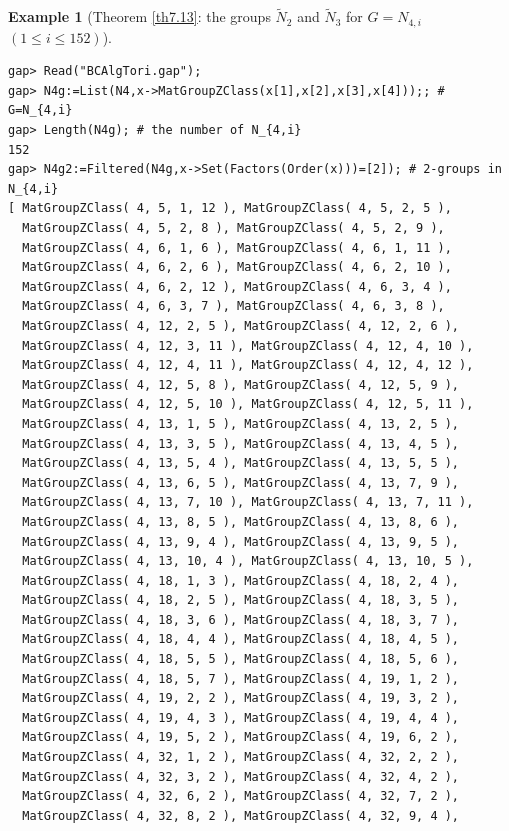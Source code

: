 \documentclass{amsart}
\theoremstyle{plain}
\theoremstyle{definition}
\newtheorem{example}[theorem]{Example}
\theoremstyle{remark}
\begin{document}
\bigskip
\begin{example}[Theorem \ref{th7.13}: the groups $\widetilde{N}_2$ and $\widetilde{N}_3$ for $G=N_{4,i}$ $(1\leq i\leq 152)$]\label{ex7.15}~\vspace*{-5mm}\\
\begin{verbatim}
gap> Read("BCAlgTori.gap");
gap> N4g:=List(N4,x->MatGroupZClass(x[1],x[2],x[3],x[4]));; # G=N_{4,i}
gap> Length(N4g); # the number of N_{4,i}
152
gap> N4g2:=Filtered(N4g,x->Set(Factors(Order(x)))=[2]); # 2-groups in N_{4,i}
[ MatGroupZClass( 4, 5, 1, 12 ), MatGroupZClass( 4, 5, 2, 5 ), 
  MatGroupZClass( 4, 5, 2, 8 ), MatGroupZClass( 4, 5, 2, 9 ), 
  MatGroupZClass( 4, 6, 1, 6 ), MatGroupZClass( 4, 6, 1, 11 ), 
  MatGroupZClass( 4, 6, 2, 6 ), MatGroupZClass( 4, 6, 2, 10 ), 
  MatGroupZClass( 4, 6, 2, 12 ), MatGroupZClass( 4, 6, 3, 4 ), 
  MatGroupZClass( 4, 6, 3, 7 ), MatGroupZClass( 4, 6, 3, 8 ), 
  MatGroupZClass( 4, 12, 2, 5 ), MatGroupZClass( 4, 12, 2, 6 ), 
  MatGroupZClass( 4, 12, 3, 11 ), MatGroupZClass( 4, 12, 4, 10 ), 
  MatGroupZClass( 4, 12, 4, 11 ), MatGroupZClass( 4, 12, 4, 12 ), 
  MatGroupZClass( 4, 12, 5, 8 ), MatGroupZClass( 4, 12, 5, 9 ), 
  MatGroupZClass( 4, 12, 5, 10 ), MatGroupZClass( 4, 12, 5, 11 ), 
  MatGroupZClass( 4, 13, 1, 5 ), MatGroupZClass( 4, 13, 2, 5 ), 
  MatGroupZClass( 4, 13, 3, 5 ), MatGroupZClass( 4, 13, 4, 5 ), 
  MatGroupZClass( 4, 13, 5, 4 ), MatGroupZClass( 4, 13, 5, 5 ), 
  MatGroupZClass( 4, 13, 6, 5 ), MatGroupZClass( 4, 13, 7, 9 ), 
  MatGroupZClass( 4, 13, 7, 10 ), MatGroupZClass( 4, 13, 7, 11 ), 
  MatGroupZClass( 4, 13, 8, 5 ), MatGroupZClass( 4, 13, 8, 6 ), 
  MatGroupZClass( 4, 13, 9, 4 ), MatGroupZClass( 4, 13, 9, 5 ), 
  MatGroupZClass( 4, 13, 10, 4 ), MatGroupZClass( 4, 13, 10, 5 ), 
  MatGroupZClass( 4, 18, 1, 3 ), MatGroupZClass( 4, 18, 2, 4 ), 
  MatGroupZClass( 4, 18, 2, 5 ), MatGroupZClass( 4, 18, 3, 5 ), 
  MatGroupZClass( 4, 18, 3, 6 ), MatGroupZClass( 4, 18, 3, 7 ), 
  MatGroupZClass( 4, 18, 4, 4 ), MatGroupZClass( 4, 18, 4, 5 ), 
  MatGroupZClass( 4, 18, 5, 5 ), MatGroupZClass( 4, 18, 5, 6 ), 
  MatGroupZClass( 4, 18, 5, 7 ), MatGroupZClass( 4, 19, 1, 2 ), 
  MatGroupZClass( 4, 19, 2, 2 ), MatGroupZClass( 4, 19, 3, 2 ), 
  MatGroupZClass( 4, 19, 4, 3 ), MatGroupZClass( 4, 19, 4, 4 ), 
  MatGroupZClass( 4, 19, 5, 2 ), MatGroupZClass( 4, 19, 6, 2 ), 
  MatGroupZClass( 4, 32, 1, 2 ), MatGroupZClass( 4, 32, 2, 2 ), 
  MatGroupZClass( 4, 32, 3, 2 ), MatGroupZClass( 4, 32, 4, 2 ), 
  MatGroupZClass( 4, 32, 6, 2 ), MatGroupZClass( 4, 32, 7, 2 ), 
  MatGroupZClass( 4, 32, 8, 2 ), MatGroupZClass( 4, 32, 9, 4 ), 

\end{verbatim}
\end{example}
\end{document}
